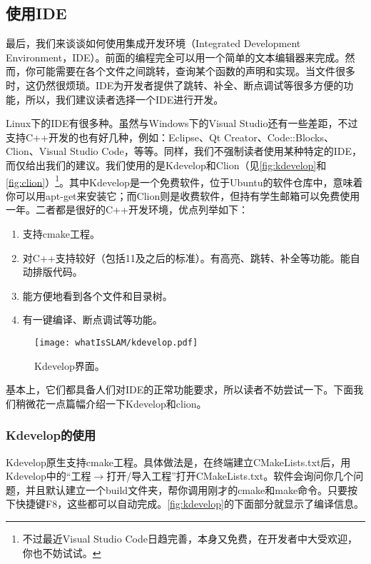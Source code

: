 \subsection{使用IDE}
最后，我们来谈谈如何使用集成开发环境（Integrated Development Environment，IDE）。前面的编程完全可以用一个简单的文本编辑器来完成。然而，你可能需要在各个文件之间跳转，查询某个函数的声明和实现。当文件很多时，这仍然很烦琐。IDE为开发者提供了跳转、补全、断点调试等很多方便的功能，所以，我们建议读者选择一个IDE进行开发。

Linux下的IDE有很多种。虽然与Windows下的Visual Studio还有一些差距，不过支持C++开发的也有好几种，例如：Eclipse、Qt Creator、Code::Blocks、Clion、Visual Studio Code，等等。同样，我们不强制读者使用某种特定的IDE，而仅给出我们的建议。我们使用的是Kdevelop和Clion（见\autoref{fig:kdevelop}和\autoref{fig:clion}）\footnote{不过最近Visual Studio Code日趋完善，本身又免费，在开发者中大受欢迎，你也不妨试试。}。其中Kdevelop是一个免费软件，位于Ubuntu的软件仓库中，意味着你可以用apt-get来安装它；而Clion则是收费软件，但持有学生邮箱可以免费使用一年。二者都是很好的C++开发环境，优点列举如下：

\begin{enumerate}
	\item 支持cmake工程。
	\item 对C++支持较好（包括11及之后的标准）。有高亮、跳转、补全等功能。能自动排版\mbox{代码。}
	\item 能方便地看到各个文件和目录树。
	\item 有一键编译、断点调试等功能。
\end{enumerate}

\begin{figure}[!ht]
	\centering
	\texttt{[image: whatIsSLAM/kdevelop.pdf]}
	\caption{Kdevelop界面。}
	\label{fig:kdevelop}
\end{figure}

基本上，它们都具备人们对IDE的正常功能要求，所以读者不妨尝试一下。下面我们稍微花一点篇幅介绍一下Kdevelop和clion。

\subsubsection{Kdevelop的使用}

Kdevelop原生支持cmake工程。具体做法是，在终端建立CMakeLists.txt后，用Kdevelop中的“工程$\rightarrow$打开/导入工程”打开CMakeLists.txt。软件会询问你几个问题，并且默认建立一个build文件夹，帮你调用刚才的cmake和make命令。只要按下快捷键F8，这些都可以自动完成。\autoref{fig:kdevelop}的下面部分就显示了编译信息。

